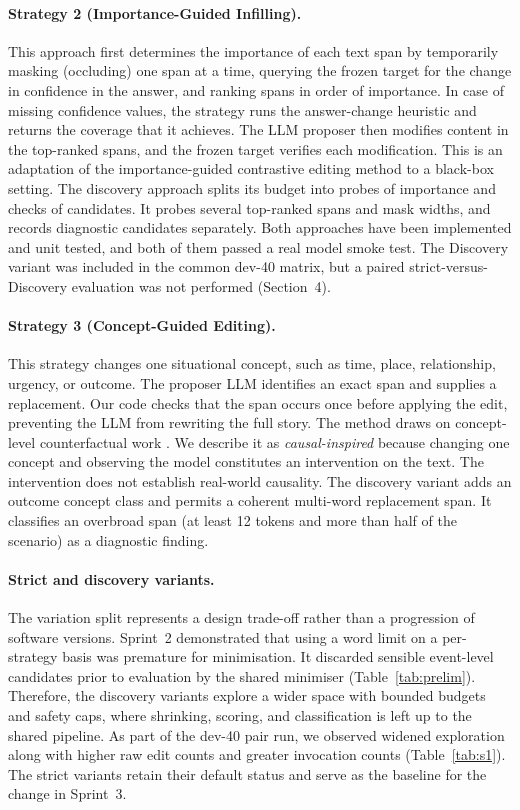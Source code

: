 \documentclass[11pt,a4paper]{article}
\newcommand{\strattwo}{Strategy 2 (Importance-Guided Infilling)}
\newcommand{\stratthree}{Strategy 3 (Concept-Guided Editing)}
\begin{document}
\paragraph{\strattwo{}.}
This approach first determines the importance of each text span by temporarily
masking (occluding) one span at a time, querying the frozen target for the change in confidence in
the answer, and ranking spans in order of importance. In case of missing confidence
values, the strategy runs the answer-change heuristic and returns the coverage that
it achieves. The LLM proposer then modifies content in the top-ranked spans, and
the frozen target verifies each modification. This is an adaptation of the importance-guided
contrastive editing method \cite{ross2021} to a black-box setting. The discovery
approach splits its budget into probes of importance and checks of candidates.
It probes several top-ranked spans and mask widths, and records diagnostic
candidates separately. Both approaches have been implemented and unit tested, and both
of them passed a real model smoke test. The Discovery variant was included in the
common dev-40 matrix, but a paired strict-versus-Discovery evaluation was not
performed (Section~4).

\paragraph{\stratthree{}.}
This strategy changes one situational concept, such as time, place, relationship,
urgency, or outcome. The proposer LLM identifies an exact span and supplies a
replacement. Our code checks that the span occurs once before applying the edit,
preventing the LLM from rewriting the full story. The method draws on concept-level
counterfactual work \cite{gat2024}. We describe it as \emph{causal-inspired} because
changing one concept and observing the model constitutes an intervention on the
text. The intervention does not establish real-world causality. The discovery
variant adds an outcome concept class and permits a coherent multi-word replacement
span. It classifies an overbroad span (at least 12 tokens and more than half of the
scenario) as a diagnostic finding.

\paragraph{Strict and discovery variants.}
The variation split represents a design trade-off rather than a progression of
software versions. Sprint~2 demonstrated that using a word limit on a per-strategy
basis was premature for minimisation. It discarded sensible event-level
candidates prior to evaluation by the shared minimiser (Table~\ref{tab:prelim}).
Therefore, the discovery variants explore a wider space with bounded budgets and
safety caps, where shrinking, scoring, and classification is left up to the shared
pipeline. As part of the dev-40 pair run, we observed widened exploration along
with higher raw edit counts and greater invocation counts
(Table~\ref{tab:s1}). The strict variants retain their default status and serve as
the baseline for the change in Sprint~3.
\end{document}
